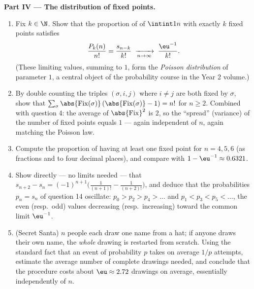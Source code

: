 \begin{problem}
\medskip
\noindent\textbf{Part IV --- The distribution of fixed points.}
\begin{enumerate}[resume]
  \item Fix $k \in \N$. Show that the proportion of 
        of $\intint1n$ with exactly $k$ fixed points satisfies
        \[
        \frac{P_k(n)}{n!} = \frac{s_{n-k}}{k!}
        \;\xrightarrow[n \to \infty]{}\; \frac{\eu^{-1}}{k!} .
        \]
        (These limiting values, summing to $1$, form the
        \emph{Poisson distribution} of parameter $1$, a central
        object of the probability course in the Year 2 volume.)
  \item By double counting the triples $(\sigma, i, j)$ where $i
        \neq j$ are both fixed by $\sigma$, show that
        $\sum_\sigma \abs{\mathrm{Fix}(\sigma)}\,
        (\abs{\mathrm{Fix}(\sigma)} - 1) = n!$ for $n \geq 2$.
        Combined with question 4: the average of
        $\abs{\mathrm{Fix}}^2$ is $2$, so the ``spread'' (variance)
        of the number of fixed points equals $1$ --- again
        independent of $n$, again matching the Poisson law.
  \item Compute the proportion of  having at least one
        fixed point for $n = 4, 5, 6$ (as fractions and to four
        decimal places), and compare with $1 - \eu^{-1} \approx
        0.6321$.
  \item Show directly --- no limits needed --- that $s_{n+2} - s_n
        = (-1)^{n+1}\bigl(\frac1{(n+1)!} - \frac1{(n+2)!}\bigr)$,
        and deduce that the probabilities $p_n = s_n$ of
        question 14 oscillate: $p_0 > p_2 > p_4 > \dots$ and
        $p_1 < p_3 < p_5 < \dots$, the even (resp.\ odd) values
        decreasing (resp.\ increasing) toward the common limit
        $\eu^{-1}$.
  \item (Secret Santa) $n$ people each draw one name from a hat;
        if anyone draws their own name, the \emph{whole} drawing is
        restarted from scratch. Using the standard fact that an
        event of probability $p$ takes on average $1/p$ attempts,
        estimate the average number of complete drawings needed,
        and conclude that the procedure costs about $\eu \approx
        2.72$ drawings on average, essentially independently of
        $n$.
\end{enumerate}


\end{problem}
